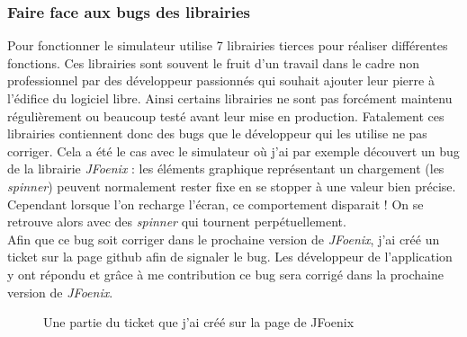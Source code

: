 \subsubsection{Faire face aux bugs des librairies}
Pour fonctionner le simulateur utilise 7 librairies tierces pour réaliser différentes fonctions. Ces librairies sont souvent le fruit d'un travail dans le cadre non professionnel par des développeur passionnés qui souhait ajouter leur pierre à l'édifice du logiciel libre. Ainsi certains librairies ne sont pas forcément maintenu régulièrement ou beaucoup testé avant leur mise en production. Fatalement ces librairies contiennent donc des bugs que le développeur qui les utilise ne pas corriger. Cela a été le cas avec le simulateur où j'ai par exemple découvert un bug de la librairie \emph{JFoenix} : les éléments graphique représentant un chargement (les \emph{spinner}) peuvent normalement rester fixe en se stopper à une valeur bien précise. Cependant lorsque l'on recharge l'écran, ce comportement disparait ! On se retrouve alors avec des \emph{spinner} qui tournent perpétuellement.\\

Afin que ce bug soit corriger dans le prochaine version de \emph{JFoenix}, j'ai créé un \gls{ticket} sur la page \gls{github} afin de signaler le bug. Les développeur de l'application y ont répondu et grâce à me contribution ce bug sera corrigé dans la prochaine version de \emph{JFoenix}.

\begin{figure}[h]
	\begin{center}
		\caption{Une partie du ticket que j'ai créé sur la page de JFoenix}
	\end{center}
\end{figure}

